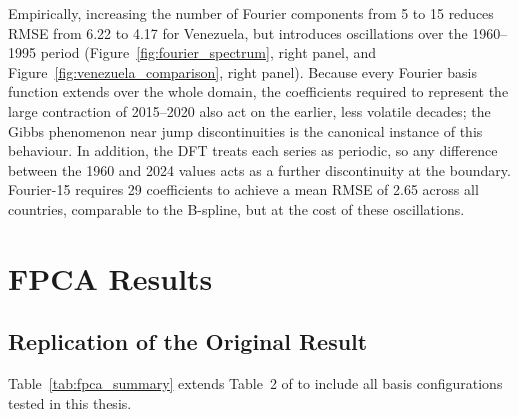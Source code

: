 Empirically, increasing the number of Fourier components from 5 to 15 reduces
RMSE from 6.22 to 4.17 for Venezuela, but introduces oscillations over the
1960--1995 period (Figure~\ref{fig:fourier_spectrum}, right panel, and
Figure~\ref{fig:venezuela_comparison}, right panel). Because every Fourier
basis function extends over the whole domain, the coefficients required to
represent the large contraction of 2015--2020 also act on the earlier, less
volatile decades; the Gibbs phenomenon near jump discontinuities is the
canonical instance of this behaviour. In addition, the DFT treats each series as
periodic, so any difference between the 1960 and 2024 values acts as a further
discontinuity at the boundary. Fourier-15 requires 29 coefficients to achieve a
mean RMSE of 2.65 across all countries, comparable to the B-spline, but at the
cost of these oscillations.

\section{FPCA Results}
\label{sec:fpca_results}

\subsection{Replication of the Original Result}
\label{subsec:replication}

Table~\ref{tab:fpca_summary} extends Table~2 of \cite{padilla2020} to include
all basis configurations tested in this thesis.

